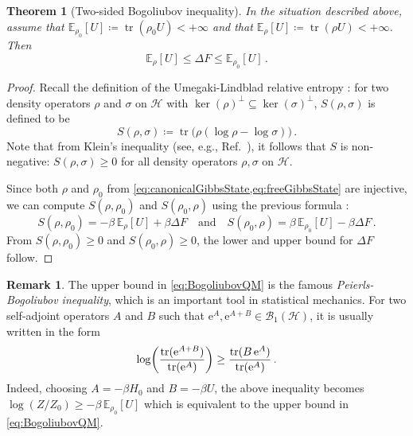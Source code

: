 \documentclass[a4paper, twoside, 11pt, reqno]{amsart}
\theoremstyle{definition}
\newtheorem{remark}[definition]{Remark}
\theoremstyle{plain}
\newtheorem{theorem}[definition]{Theorem}
\renewcommand{\subset}{\subseteq}
\let\originalleft\left
\let\originalright\right
\renewcommand{\left}{\mathopen{}\mathclose\bgroup\originalleft}
\renewcommand{\right}{\aftergroup\egroup\originalright}
\renewcommand{\Delta}{\varDelta}
\newcommand{\MH}{\mathcal{H}}
\newcommand{\ee}{\mathrm{e}}
\newcommand{\BO}{\mathscr{B}}
\newcommand{\NO}{\BO_1}
\newcommand{\1}{\mathbf{1}}
\newcommand{\EV}{\mathbb{E}}
\DeclareMathOperator{\tr}{tr}
\newcommand{\ce}{\coloneqq}
\newcommand{\tand}{\quad\text{and}\quad}
\begin{document}
\begin{theorem}[Two-sided Bogoliubov inequality]\label{thm:BogoliubovQM}
    In the situation described above, assume that $\EV_{\rho_0} [U] \ce \tr (\rho_0 U) < + \infty$ and that $\EV_{\rho} [U] \ce \tr (\rho U) < + \infty$. Then
    \begin{equation}\label{eq:BogoliubovQM}
        \EV_{\rho} [U] \le \Delta F \le \EV_{\rho_0} [U] \, .
    \end{equation}
\end{theorem}

\begin{proof}
    Recall the definition of the Umegaki-Lindblad relative entropy \cite{Lindblad73, Umegaki62}: for two density operators $\rho$ and $\sigma$ on $\MH$ with $\ker(\rho)^\perp \subset \ker(\sigma)^\perp$, $S(\rho, \sigma)$ is defined to be \cite[Eq. (1.3)]{OP2004}
    \begin{equation}\label{eq:UmegakiRelEnt}
        S(\rho, \sigma) \ce \tr \bigl(\rho (\log \rho - \log \sigma)\bigr) \, .
    \end{equation}
    Note that from Klein's inequality (see, e.g., Ref.~\cite[Eq. (3.27)]{OP2004}), it follows that $S$ is non-negative: $S(\rho, \sigma) \ge 0$ for all density operators $\rho, \sigma$ on $\MH$.
    
    Since both $\rho$ and $\rho_0$ from \cref{eq:canonicalGibbsState,eq:freeGibbsState} are injective, we can compute $S(\rho, \rho_0)$ and $S(\rho_0, \rho)$ using the previous formula \cite[pp. 8 f.]{Reible2022}:
    \begin{equation}\label{eq:realtiveFreeEnergyFQS}
        S(\rho, \rho_0) = - \beta \, \EV_{\rho}[U] + \beta \Delta F \tand S(\rho_0, \rho) = \beta \, \EV_{\rho_0}[U] - \beta \Delta F \, .
    \end{equation}
    From $S(\rho, \rho_0) \ge 0$ and $S(\rho_0, \rho) \ge 0$, the lower and upper bound for $\Delta F$ follow.
\end{proof}

\begin{remark}\label{rem:BogoliubovQM}
    The upper bound in \cref{eq:BogoliubovQM} is the famous \emph{Peierls-Bogoliubov inequality}, which is an important tool in statistical mechanics. For two self-adjoint operators $A$ and $B$ such that $\ee^A, \ee^{A + B} \in \NO(\MH)$, it is usually written in the form \cite[Cor. 3.15]{OP2004}
    \begin{equation*}
        \log\left(\frac{\tr(\ee^{A + B})}{\tr(\ee^A)}\right) \ge \frac{\tr(B \, \ee^A)}{\tr(\ee^A)} \, .
    \end{equation*}
    Indeed, choosing $A = - \beta H_0$ and $B = - \beta U$, the above inequality becomes $\log(Z / Z_0) \ge - \beta \, \EV_{\rho_0}[U]$ which is equivalent to the upper bound in \cref{eq:BogoliubovQM}.
\end{remark}
\end{document}
